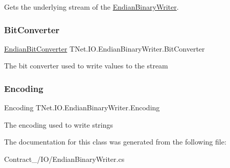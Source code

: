 Gets the underlying stream of the \mbox{\hyperlink{class_t_net_1_1_i_o_1_1_endian_binary_writer}{Endian\+Binary\+Writer}}. 

\mbox{\label{class_t_net_1_1_i_o_1_1_endian_binary_writer_a8c822aded2ba7d9f2769f94a49d01c2e}} 
\subsubsection{\texorpdfstring{Bit\+Converter}{BitConverter}}
{\footnotesize\ttfamily \mbox{\hyperlink{class_t_net_1_1_i_o_1_1_endian_bit_converter}{Endian\+Bit\+Converter}} T\+Net.\+I\+O.\+Endian\+Binary\+Writer.\+Bit\+Converter\hspace{0.3cm}{\ttfamily [get]}}



The bit converter used to write values to the stream 

\mbox{\label{class_t_net_1_1_i_o_1_1_endian_binary_writer_a0148eabc0f952c96b0a43d364c60c03b}} 
\subsubsection{\texorpdfstring{Encoding}{Encoding}}
{\footnotesize\ttfamily Encoding T\+Net.\+I\+O.\+Endian\+Binary\+Writer.\+Encoding\hspace{0.3cm}{\ttfamily [get]}}



The encoding used to write strings 



The documentation for this class was generated from the following file\+:\begin{DoxyCompactItemize}
\item 
Contract\+\_\+/\+I\+O/Endian\+Binary\+Writer.\+cs\end{DoxyCompactItemize}
